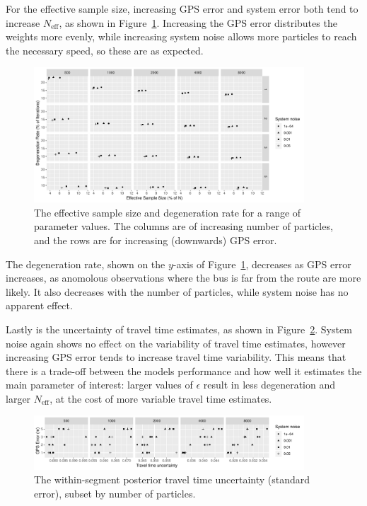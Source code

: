 For the effective sample size, 
increasing GPS error and system error both tend to
increase $N_\text{eff}$, as shown in Figure~\ref{fig:degen_rate}.
Increasing the GPS error distributes the weights more evenly,
while increasing system noise allows more particles to reach
the necessary speed,
so these are as expected.

\begin{figure}[tb]
    \centering
    \includegraphics[width=0.9\textwidth]{figures/04_model_results_degen.pdf}
    \caption{The effective sample size and degeneration rate for a range of parameter 
        values. The columns are of increasing number of particles,
        and the rows are for increasing (downwards) GPS error.}
    \label{fig:degen_rate}
\end{figure}

The degeneration rate, 
shown on the $y$-axis of Figure~\ref{fig:degen_rate},
decreases as GPS error increases,
as anomolous observations where the bus is far from the route
are more likely.
It also decreases with the number of particles,
while system noise has no apparent effect.


Lastly is the uncertainty of travel time estimates,
as shown in Figure~\ref{fig:travel_times}.
System noise again shows no effect on the variability of travel time estimates,
however increasing GPS error tends to increase travel time variability.
This means that there is a trade-off between the models performance
and how well it estimates the main parameter of interest:
larger values of $\epsilon$ result in less degeneration and larger $N_\text{eff}$,
at the cost of more variable travel time estimates.


\begin{figure}[tb]
    \centering
    \includegraphics[width=0.9\textwidth]{figures/04_model_results_times.pdf}
    \caption{The within-segment posterior travel time uncertainty (standard error), subset by number of particles.}
    \label{fig:travel_times}
\end{figure}


